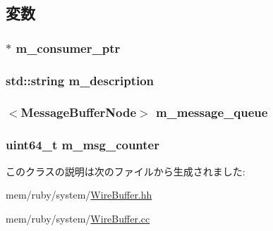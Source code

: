 \subsection{変数}
\hypertarget{classWireBuffer_a83dd1dc8eef330b0c0d184a4167b26b4}{
\subsubsection[{m\_\-consumer\_\-ptr}]{$\ast$ {\bf m\_\-consumer\_\-ptr}}}
\label{classWireBuffer_a83dd1dc8eef330b0c0d184a4167b26b4}
\hypertarget{classWireBuffer_ad50eef5f7fcfa30f62e14f0fac2a4f6e}{
\subsubsection[{m\_\-description}]{\setlength{\rightskip}{0pt plus 5cm}std::string {\bf m\_\-description}}}
\label{classWireBuffer_ad50eef5f7fcfa30f62e14f0fac2a4f6e}
\hypertarget{classWireBuffer_a39fe545546f6c318a857521c207f2823}{
\subsubsection[{m\_\-message\_\-queue}]{$<${\bf MessageBufferNode}$>$ {\bf m\_\-message\_\-queue}}}
\label{classWireBuffer_a39fe545546f6c318a857521c207f2823}
\hypertarget{classWireBuffer_a3d60a9aaa917e449f52162fd0e6d3f25}{
\subsubsection[{m\_\-msg\_\-counter}]{\setlength{\rightskip}{0pt plus 5cm}uint64\_\-t {\bf m\_\-msg\_\-counter}}}
\label{classWireBuffer_a3d60a9aaa917e449f52162fd0e6d3f25}


このクラスの説明は次のファイルから生成されました:\begin{DoxyCompactItemize}
\item 
mem/ruby/system/\hyperlink{WireBuffer_8hh}{WireBuffer.hh}\item 
mem/ruby/system/\hyperlink{WireBuffer_8cc}{WireBuffer.cc}\end{DoxyCompactItemize}
